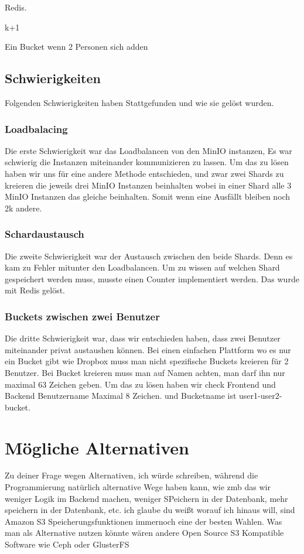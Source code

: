 \documentclass[12pt]{report}
\begin{document}
			Redis.
			
			k+1 
			
			Ein Bucket wenn 2 Personen sich adden
			
			\subsection{Schwierigkeiten}
				Folgenden Schwierigkeiten haben Stattgefunden und wie sie gelöst wurden.
				
				\subsubsection{Loadbalacing}
					Die erste Schwierigkeit war das Loadbalancen von den MinIO instanzen, Es war schwierig die Instanzen miteinander kommunizieren zu lassen. Um das zu lösen haben wir uns für eine andere Methode entschieden, und zwar zwei Shards zu kreieren die jeweils drei MinIO Instanzen beinhalten wobei in einer Shard alle 3 MinIO Instanzen das gleiche beinhalten. Somit wenn eine Ausfällt bleiben noch 2k andere.
			
				\subsubsection{Schardaustausch}
					Die zweite Schwierigkeit war der Austausch zwischen den beide Shards. Denn es kam zu Fehler mitunter den Loadbalancen. Um zu wissen auf welchen Shard gespeichert werden muss, musste einen Counter implementiert werden. Das wurde mit Redis gelöst.
				
				\subsubsection{Buckets zwischen zwei Benutzer}
					Die dritte Schwierigkeit war, dass wir entschieden haben, dass zwei Benutzer miteinander privat austaushen können. Bei einen einfachen Plattform wo es nur ein Bucket gibt wie Dropbox muss man nicht spezifische Buckets kreieren für 2 Benutzer. Bei Bucket kreieren muss man auf Namen achten, man darf ihn nur maximal 63 Zeichen geben. Um das zu lösen haben wir check Frontend und Backend Benutzername Maximal 8 Zeichen. und Bucketname ist user1-user2-bucket.
			
	\section{Mögliche Alternativen}
		Zu deiner Frage wegen Alternativen, ich würde schreiben, während die Programmierung natürlich alternative Wege haben kann, wie zmb das wir weniger Logik im Backend machen, weniger SPeichern in der Datenbank, mehr speichern in der Datenbank, etc.  ich glaube du weißt worauf ich hinaus will, sind Amazon S3 Speicherungsfunktionen immernoch eine der besten Wahlen.
		Was man als Alternative nutzen könnte wären andere Open Source S3 Kompatible Software wie Ceph oder GlusterFS
		
\end{document}
